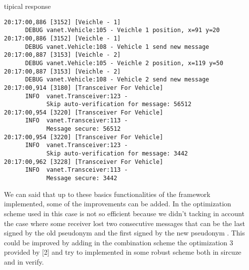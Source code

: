 \hybrid tipical response
\begin{verbatim}
20:17:00,886 [3152] [Veichle - 1] 
      DEBUG vanet.Vehicle:105 - Veichle 1 position, x=91 y=20
20:17:00,886 [3152] [Veichle - 1] 
      DEBUG vanet.Vehicle:108 - Vehicle 1 send new message
20:17:00,887 [3153] [Veichle - 2] 
      DEBUG vanet.Vehicle:105 - Veichle 2 position, x=119 y=50
20:17:00,887 [3153] [Veichle - 2] 
      DEBUG vanet.Vehicle:108 - Vehicle 2 send new message
20:17:00,914 [3180] [Transceiver For Vehicle] 
      INFO  vanet.Transceiver:123 - 
            Skip auto-verification for message: 56512
20:17:00,954 [3220] [Transceiver For Vehicle] 
      INFO  vanet.Transceiver:113 - 
            Message secure: 56512
20:17:00,954 [3220] [Transceiver For Vehicle] 
      INFO  vanet.Transceiver:123 - 
            Skip auto-verification for message: 3442
20:17:00,962 [3228] [Transceiver For Vehicle] 
      INFO  vanet.Transceiver:113 - 
            Message secure: 3442
\end{verbatim}
We can said that up to these basics functionalities of the framework implemented, some of the improvements can be added.  In the optimization scheme used in this case is not so efficient because we didn't tacking in account the case where some receiver lost two consecutive messages that can be the last signed by the old pseudonym and the first signed by the  new pseudonym . This could be improved by adding in the combination scheme the optimization 3 provided by [2] and try to implemented in some robust scheme both in sircuze and in verify.\\
